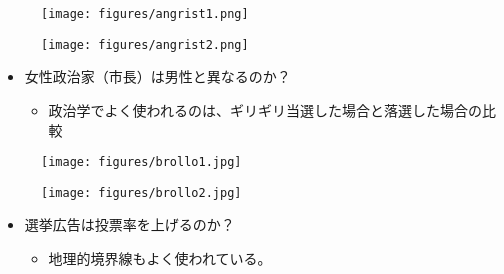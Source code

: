 \documentclass[
  xelatex,
  ja=standard]{bxjsarticle}
\providecommand{\tightlist}{%
  \setlength{\itemsep}{0pt}\setlength{\parskip}{0pt}}\usepackage{longtable,booktabs,array}
\begin{document}
\begin{figure}[htpb]

{\centering \texttt{[image: figures/angrist1.png]}

}

\caption{\citet{angrist1999}}

\end{figure}

\begin{figure}[htpb]

{\centering \texttt{[image: figures/angrist2.png]}

}

\caption{\citet{angrist1999}}

\end{figure}

\begin{itemize}
\tightlist
\item
  女性政治家（市長）は男性と異なるのか？

  \begin{itemize}
  \tightlist
  \item
    政治学でよく使われるのは、ギリギリ当選した場合と落選した場合の比較
  \end{itemize}
\end{itemize}

\begin{figure}[htpb]

{\centering \texttt{[image: figures/brollo1.jpg]}

}

\caption{\citet{brollo2016}}

\end{figure}

\begin{figure}[htpb]

{\centering \texttt{[image: figures/brollo2.jpg]}

}

\caption{\citet{brollo2016}}

\end{figure}

\begin{itemize}
\tightlist
\item
  選挙広告は投票率を上げるのか？

  \begin{itemize}
  \tightlist
  \item
    地理的境界線もよく使われている。
  \end{itemize}
\end{itemize}
\end{document}
